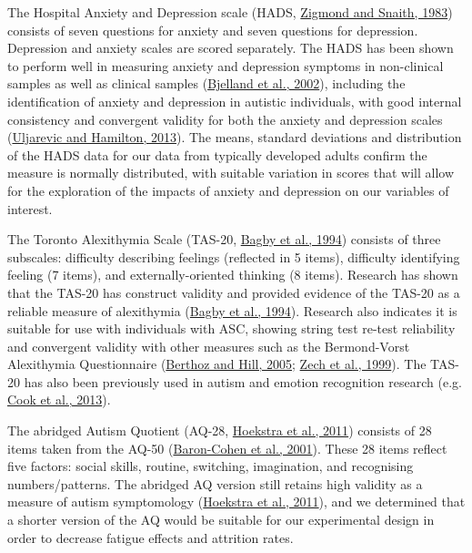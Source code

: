 \documentclass[
]{article}
\begin{document}
The Hospital Anxiety and Depression scale (HADS, \protect\hyperlink{ref-zigmond1983a}{Zigmond and Snaith, 1983}) consists of seven questions for anxiety and seven questions for depression. Depression and anxiety scales are scored separately. The HADS has been shown to perform well in measuring anxiety and depression symptoms in non-clinical samples as well as clinical samples (\protect\hyperlink{ref-bjelland2002a}{Bjelland et al., 2002}), including the identification of anxiety and depression in autistic individuals, with good internal consistency and convergent validity for both the anxiety and depression scales (\protect\hyperlink{ref-uljarevic2013a}{Uljarevic and Hamilton, 2013}). The means, standard deviations and distribution of the HADS data for our data from typically developed adults confirm the measure is normally distributed, with suitable variation in scores that will allow for the exploration of the impacts of anxiety and depression on our variables of interest.

The Toronto Alexithymia Scale (TAS-20, \protect\hyperlink{ref-bagby1994a}{Bagby et al., 1994}) consists of three subscales: difficulty describing feelings (reflected in 5 items), difficulty identifying feeling (7 items), and externally-oriented thinking (8 items). Research has shown that the TAS-20 has construct validity and provided evidence of the TAS-20 as a reliable measure of alexithymia (\protect\hyperlink{ref-bagby1994a}{Bagby et al., 1994}). Research also indicates it is suitable for use with individuals with ASC, showing string test re-test reliability and convergent validity with other measures such as the Bermond-Vorst Alexithymia Questionnaire (\protect\hyperlink{ref-berthoz2005a}{Berthoz and Hill, 2005}; \protect\hyperlink{ref-zech1999a}{Zech et al., 1999}). The TAS-20 has also been previously used in autism and emotion recognition research (e.g. \protect\hyperlink{ref-cook2013a}{Cook et al., 2013}).

The abridged Autism Quotient (AQ-28, \protect\hyperlink{ref-hoekstra2011a}{Hoekstra et al., 2011}) consists of 28 items taken from the AQ-50 (\protect\hyperlink{ref-baron-cohen2001a}{Baron-Cohen et al., 2001}). These 28 items reflect five factors: social skills, routine, switching, imagination, and recognising numbers/patterns. The abridged AQ version still retains high validity as a measure of autism symptomology (\protect\hyperlink{ref-hoekstra2011a}{Hoekstra et al., 2011}), and we determined that a shorter version of the AQ would be suitable for our experimental design in order to decrease fatigue effects and attrition rates.
\end{document}
